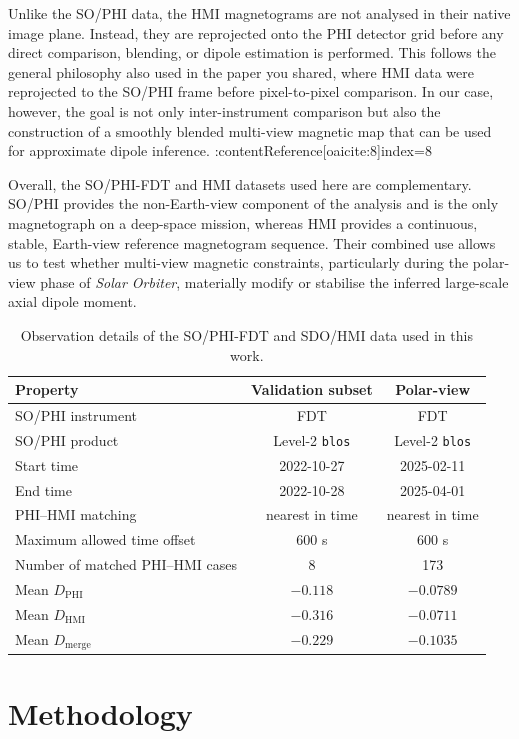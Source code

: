 \documentclass[namedreferences,hyperref,optionalrh]{spr-sola}
\begin{document}
Unlike the SO/PHI data, the HMI magnetograms are not analysed in their native image plane. Instead, they are reprojected onto the PHI detector grid before any direct comparison, blending, or dipole estimation is performed. This follows the general philosophy also used in the paper you shared, where HMI data were reprojected to the SO/PHI frame before pixel-to-pixel comparison. In our case, however, the goal is not only inter-instrument comparison but also the construction of a smoothly blended multi-view magnetic map that can be used for approximate dipole inference. :contentReference[oaicite:8]{index=8}

Overall, the SO/PHI-FDT and HMI datasets used here are complementary. SO/PHI provides the non-Earth-view component of the analysis and is the only magnetograph on a deep-space mission, whereas HMI provides a continuous, stable, Earth-view reference magnetogram sequence. Their combined use allows us to test whether multi-view magnetic constraints, particularly during the polar-view phase of \textit{Solar Orbiter}, materially modify or stabilise the inferred large-scale axial dipole moment.
\begin{table}
\caption{Observation details of the SO/PHI-FDT and SDO/HMI data used in this work.}
\label{tab:obs_details}
\centering
\begin{tabular}{l c c}
\hline\hline
Property & Validation subset & Polar-view \\
\hline
SO/PHI instrument & FDT & FDT \\
SO/PHI product & Level-2 \texttt{blos} & Level-2 \texttt{blos} \\
Start time & 2022-10-27 & 2025-02-11 \\
End time & 2022-10-28 & 2025-04-01 \\
PHI--HMI matching & nearest in time & nearest in time \\
Maximum allowed time offset & 600 s & 600 s \\
Number of matched PHI--HMI cases & 8 & 173 \\
Mean $D_{\mathrm{PHI}}$ & $-0.118$ & $-0.0789$ \\
Mean $D_{\mathrm{HMI}}$ & $-0.316$ & $-0.0711$ \\
Mean $D_{\mathrm{merge}}$ & $-0.229$ & $-0.1035$ \\
\hline
\end{tabular}
\end{table}
\section{Methodology}
\label{sec:method}
\end{document}
